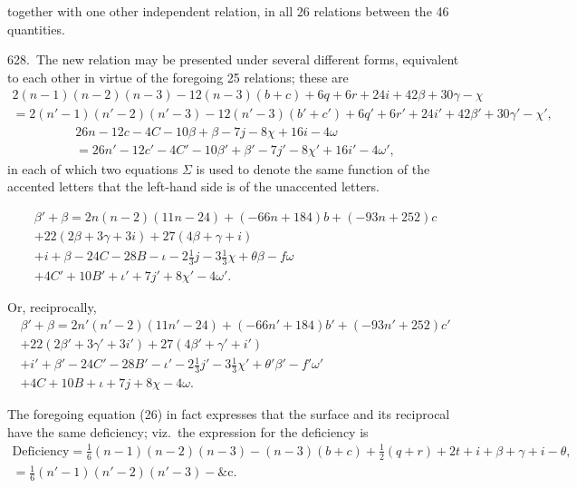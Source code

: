 \documentclass[11pt,a4paper]{article}
\theoremstyle{plain}
\theoremstyle{definition}
\theoremstyle{remark}
\begin{document}
\noindent together with one other independent relation, in all 26 relations between the 46 quantities.

628.\ The new relation may be presented under several different forms, equivalent to each other in virtue of the foregoing 25 relations; these are
\begin{multline}
2(n-1)(n-2)(n-3)-12(n-3)(b+c)+6q+6r+24i+42\beta+30\gamma-\chi\\
=2(n'-1)(n'-2)(n'-3)-12(n'-3)(b'+c')+6q'+6r'+24i'+42\beta'+30\gamma'-\chi',\tag{26}
\end{multline}
\begin{multline}
26n-12c-4C-10\beta+\beta-7j-8\chi+16i-4\omega\\
=26n'-12c'-4C'-10\beta'+\beta'-7j'-8\chi'+16i'-4\omega',\tag{27}
\end{multline}
in each of which two equations $\Sigma$ is used to denote the same function of the accented letters that the left-hand side is of the unaccented letters.

\begin{multline}
\beta'+\beta=2n(n-2)(11n-24)+(-66n+184)b+(-93n+252)c\\
+22(2\beta+3\gamma+3i)+27(4\beta+\gamma+i)\\
+i+\beta-24C-28B-\iota-2\tfrac{1}{3}j-3\tfrac{1}{3}\chi+\theta\beta-f\omega\\
+4C'+10B'+\iota'+7j'+8\chi'-4\omega'.\tag{28}
\end{multline}

Or, reciprocally,
\begin{multline}
\beta'+\beta=2n'(n'-2)(11n'-24)+(-66n'+184)b'+(-93n'+252)c'\\
+22(2\beta'+3\gamma'+3i')+27(4\beta'+\gamma'+i')\\
+i'+\beta'-24C'-28B'-\iota'-2\tfrac{1}{3}j'-3\tfrac{1}{3}\chi'+\theta'\beta'-f'\omega'\\
+4C+10B+\iota+7j+8\chi-4\omega.\tag{29}
\end{multline}

\newpage
\setcounter{page}{616}

The foregoing equation (26) in fact expresses that the surface and its reciprocal have the same deficiency; viz.\ the expression for the deficiency is
\begin{multline}
\text{Deficiency}=\tfrac{1}{6}(n-1)(n-2)(n-3)-(n-3)(b+c)+\tfrac{1}{2}(q+r)+2t+i+\beta+\gamma+i-\theta,\\
=\tfrac{1}{6}(n'-1)(n'-2)(n'-3)-\text{\&c.}\tag{30}
\end{multline}
\end{document}
